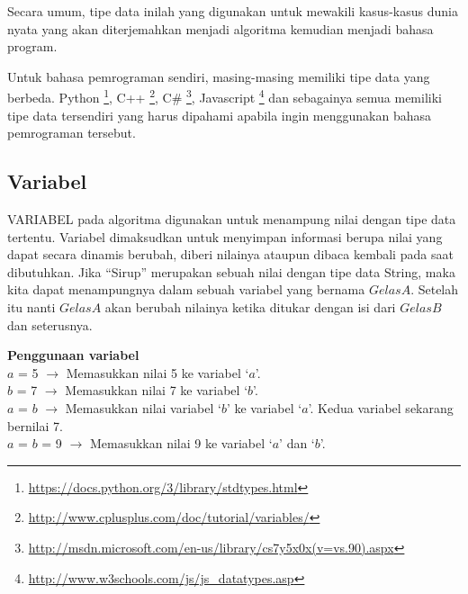 Secara umum, tipe data inilah yang digunakan untuk mewakili kasus-kasus dunia nyata yang akan diterjemahkan menjadi algoritma kemudian menjadi bahasa program. 

Untuk bahasa pemrograman sendiri, masing-masing memiliki tipe data yang berbeda. Python \footnote{\url{https://docs.python.org/3/library/stdtypes.html}}, C++ \footnote{\url{http://www.cplusplus.com/doc/tutorial/variables/}}, C\# \footnote{\url{http://msdn.microsoft.com/en-us/library/cs7y5x0x(v=vs.90).aspx}}, Javascript \footnote{\url{http://www.w3schools.com/js/js_datatypes.asp}} dan sebagainya semua memiliki tipe data tersendiri yang harus dipahami apabila ingin menggunakan bahasa pemrograman tersebut. 

\subsection{Variabel}
VARIABEL pada algoritma digunakan untuk menampung nilai dengan tipe data tertentu. Variabel dimaksudkan untuk menyimpan informasi berupa nilai yang dapat secara dinamis berubah, diberi nilainya ataupun dibaca kembali pada saat dibutuhkan. Jika ``Sirup'' merupakan sebuah nilai dengan tipe data String, maka kita dapat menampungnya dalam sebuah variabel yang bernama $GelasA$. Setelah itu nanti $GelasA$ akan berubah nilainya ketika ditukar dengan isi dari $GelasB$ dan seterusnya.
\begin{contoh}
	\textbf{Penggunaan variabel}\\
	$a$ = 5 $\rightarrow$ Memasukkan nilai 5 ke variabel `$a$'.\\
	$b$ = 7 $\rightarrow$ Memasukkan nilai 7 ke variabel `$b$'.\\
	$a$ = $b$ $\rightarrow$ Memasukkan nilai variabel `$b$' ke variabel `$a$'. Kedua variabel sekarang bernilai 7.\\
	$a$ = $b$ = 9 $\rightarrow$ Memasukkan nilai 9 ke variabel `$a$' dan `$b$'.\\
\end{contoh}


